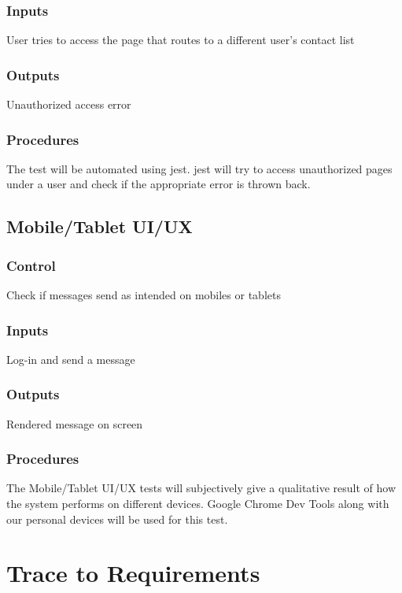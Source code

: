 \documentclass[12pt, titlepage]{article}
\begin{document}
\subsubsection{Inputs}
User tries to access the page that routes to a different user's contact list
\subsubsection{Outputs}
Unauthorized access error
\subsubsection{Procedures}
The test will be automated using jest. jest will try to access unauthorized pages under a user and check if the appropriate error is thrown back.
\subsection{Mobile/Tablet UI/UX}
\subsubsection{Control}
Check if messages send as intended on mobiles or tablets
\subsubsection{Inputs}
Log-in and send a message
\subsubsection{Outputs}
Rendered message on screen
\subsubsection{Procedures}
The Mobile/Tablet UI/UX tests will subjectively give a qualitative result of how the system performs on different devices. Google Chrome Dev Tools along with our personal devices will be used for this test.
		
\section{Trace to Requirements}
		
\end{document}
